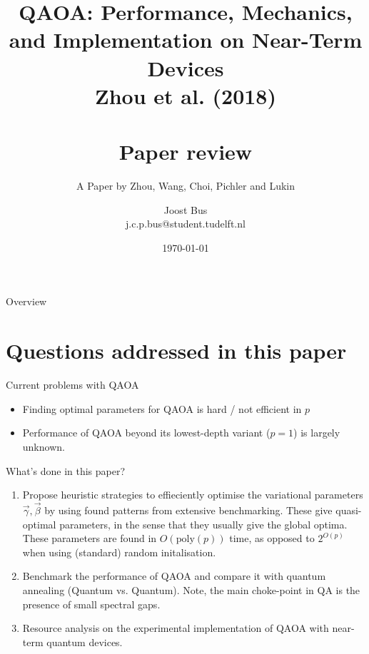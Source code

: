\documentclass{beamer}
\title[]{QAOA: Performance, Mechanics, and Implementation on Near-Term Devices\\Zhou et al. (2018) \\~\\ Paper review }
\subtitle{A Paper by Zhou, Wang, Choi, Pichler and Lukin}
\institute[]{Delft University of Technology, Netherlands}
\author{Joost Bus \\ \tiny{j.c.p.bus@student.tudelft.nl}}
\date{\today}
\begin{document}
{
\frame{\titlepage}
}
{}

\begin{frame}{Overview}
\tableofcontents
\end{frame}

\section{Questions addressed in this paper}
\begin{frame}{Current problems with QAOA}
	\begin{itemize}
		\item Finding optimal parameters for QAOA is hard / not efficient in $p$
		\item Performance of QAOA beyond its lowest-depth variant ($p=1$) is largely unknown.
	\end{itemize}
\end{frame}

\begin{frame}{What's done in this paper?}
	\begin{enumerate}
		\item Propose heuristic strategies to effieciently optimise the variational parameters $\vec{\gamma}, \vec{\beta}$ by using found patterns from extensive benchmarking. These give quasi-optimal parameters, in the sense that they usually give the global optima. These parameters are found in $O(\text{poly}(p))$ time, as opposed to $2^{O(p)}$ when using (standard) random initalisation.
		\item Benchmark the performance of QAOA and compare it with quantum annealing (Quantum vs. Quantum). Note, the main choke-point in QA is the presence of small spectral gaps.
		\item Resource analysis on the experimental implementation of QAOA with near-term quantum devices.
	\end{enumerate}
\end{frame}
\end{document}

